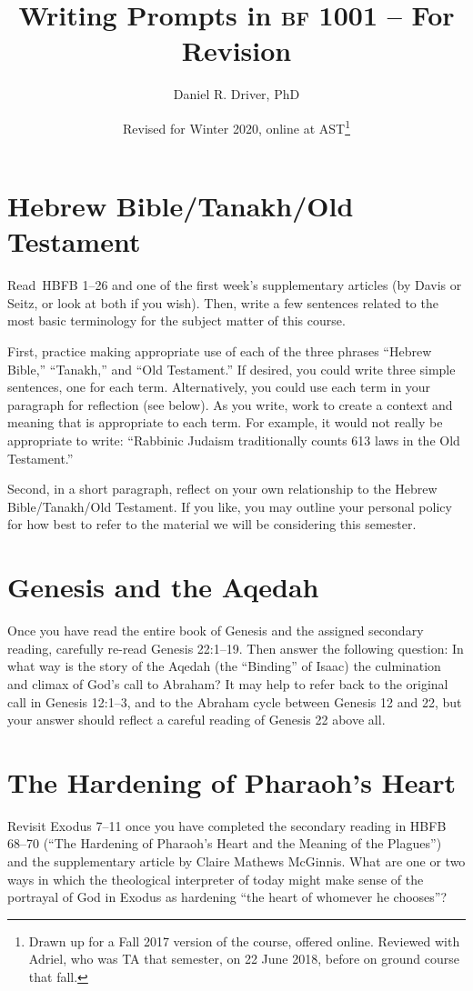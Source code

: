 \documentclass[12pt]{article}
\title{Writing Prompts in \textsc{bf} 1001 – For Revision}
\author{Daniel R. Driver, PhD}
\date{Revised for Winter 2020, online at AST\thanks{Drawn up for a Fall 2017 version of the course, offered online. Reviewed with Adriel, who was TA that semester, on 22 June 2018, before on ground course that fall.}}
\begin{document}
\maketitle

\section{Hebrew Bible/Tanakh/Old Testament}

Read HBFB 1–26 and one of the first week’s supplementary articles (by Davis or Seitz, or look at both if you wish). Then, write a few sentences related to the most basic terminology for the subject matter of this course.

First, practice making appropriate use of each of the three phrases “Hebrew Bible,” “Tanakh,” and “Old Testament.” If desired, you could write three simple sentences, one for each term. Alternatively, you could use each term in your paragraph for reflection (see below). As you write, work to create a context and meaning that is appropriate to each term. For example, it would not really be appropriate to write: “Rabbinic Judaism traditionally counts 613 laws in the Old Testament.”

Second, in a short paragraph, reflect on your own relationship to the Hebrew Bible/Tanakh/Old Testament. If you like, you may outline your personal policy for how best to refer to the material we will be considering this semester.

\section{Genesis and the Aqedah}

Once you have read the entire book of Genesis and the assigned secondary reading, carefully re-read Genesis 22:1–19. Then answer the following question: In what way is the story of the Aqedah (the “Binding” of Isaac) the culmination and climax of God’s call to Abraham? It may help to refer back to the original call in Genesis 12:1–3, and to the Abraham cycle between Genesis 12 and 22, but your answer should reflect a careful reading of Genesis 22 above all.


\section{The Hardening of Pharaoh's Heart}

Revisit Exodus 7–11 once you have completed the secondary reading in HBFB 68–70 (“The Hardening of Pharaoh’s Heart and the Meaning of the Plagues”) and the supplementary article by Claire Mathews McGinnis. What are one or two ways in which the theological interpreter of today might make sense of the portrayal of God in Exodus as hardening “the heart of whomever he chooses”?
\end{document}
